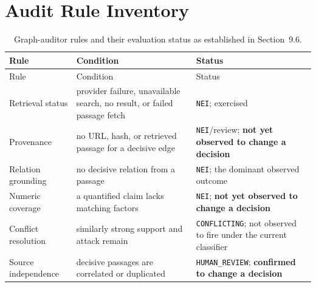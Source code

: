 \documentclass[12pt,a4paper,openany]{report}
\begin{document}
\section{Audit Rule Inventory}
\begin{longtable}{p{3.3cm}p{5.3cm}p{5cm}}
\caption{Graph-auditor rules and their evaluation status as established in Section~9.6.}\\
\toprule Rule & Condition & Status \\
\midrule
\endfirsthead
\toprule Rule & Condition & Status \\
\midrule
\endhead
Retrieval status & provider failure, unavailable search, no result, or failed passage fetch & \texttt{NEI}; exercised \\
Provenance & no URL, hash, or retrieved passage for a decisive edge & \texttt{NEI}/review; \textbf{not yet observed to change a decision} \\
Relation grounding & no decisive relation from a passage & \texttt{NEI}; the dominant observed outcome \\
Numeric coverage & a quantified claim lacks matching factors & \texttt{NEI}; \textbf{not yet observed to change a decision} \\
Conflict resolution & similarly strong support and attack remain & \texttt{CONFLICTING}; not observed to fire under the current classifier \\
Source independence & decisive passages are correlated or duplicated & \texttt{HUMAN\_REVIEW}; \textbf{confirmed to change a decision} \\
\bottomrule
\end{longtable}

\clearpage
\end{document}
